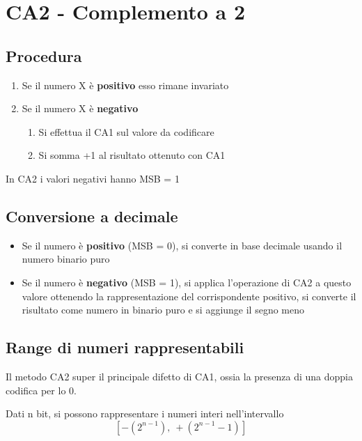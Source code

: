 \newpage
\section{CA2 - Complemento a 2}
\subsection{Procedura}
\begin{enumerate}
    \item Se il numero X è \textbf{positivo} esso rimane invariato
    \item Se il numero X è \textbf{negativo}
    \begin{enumerate}[label=\theenumi.\arabic*.]
        \item Si effettua il CA1 sul valore da codificare
        \item Si somma +1 al risultato ottenuto con CA1
    \end{enumerate}
\end{enumerate}

In CA2 i valori negativi hanno MSB = 1

\subsection{Conversione a decimale}
\begin{itemize}
    \item Se il numero è \textbf{positivo} (MSB = 0), si converte in base decimale usando il numero binario puro
    \item Se il numero è \textbf{negativo} (MSB = 1), si applica l'operazione di CA2 a questo valore ottenendo la rappresentazione del corrispondente positivo, si converte il risultato come numero in binario puro e si aggiunge il segno meno
\end{itemize}

\subsection{Range di numeri rappresentabili}
Il metodo CA2 super il principale difetto di CA1, ossia la presenza di una doppia codifica per lo 0.

Dati n bit, si possono rappresentare i numeri interi nell'intervallo
{\LARGE
    $$
    [-(2^{n-1}),\ +(2^{n-1}-1)]
    $$
}
